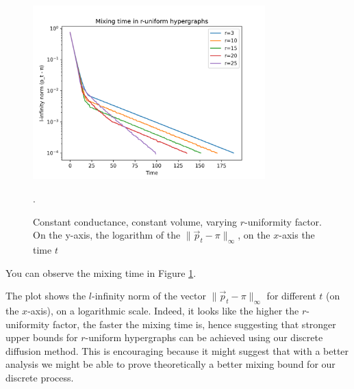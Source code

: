\documentclass[../main.tex]{subfiles}
\begin{document}
    \begin{figure}
        \centering
        \includegraphics[width=0.8\textwidth]{img/mixing_r_uniform_hypergraph.png}
        \caption{Constant conductance, constant volume, varying $r$-uniformity factor. On the y-axis, the logarithm of the $\|\vec{p}_t-\pi\|_{\infty}$, on the $x$-axis the time $t$}.
        \label{fig:r_uniform_mixing_time}
    \end{figure}
    
    You can observe the mixing time in Figure \ref{fig:r_uniform_mixing_time}. 
    
    The plot shows the $l$-infinity norm of the vector $\| \vec{p}_t - \pi\|_{\infty}$ for different $t$ (on the $x$-axis), on a logarithmic scale. Indeed, it looks like the higher the $r$-uniformity factor, the faster the mixing time is, hence suggesting that stronger upper bounds for $r$-uniform hypergraphs can be achieved using our discrete diffusion method. This is encouraging because it might suggest that with a better analysis we might be able to prove theoretically a better mixing bound for our discrete process.
    
    
\end{document}
